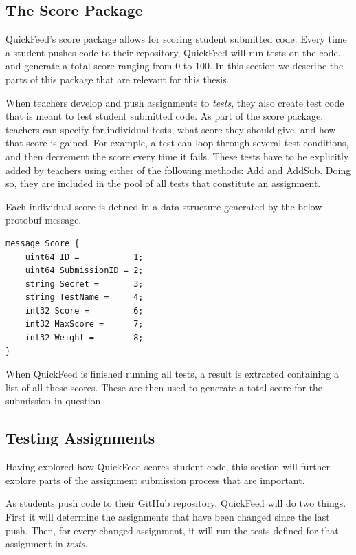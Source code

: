 \subsection{The Score Package}
\label{sec:the-score-package}

QuickFeed's score package allows for scoring student submitted code.
Every time a student pushes code to their repository, QuickFeed will run tests on the code, and generate a total score ranging from 0 to 100.
In this section we describe the parts of this package that are relevant for this thesis.

When teachers develop and push assignments to \textit{tests}, they also create test code that is meant to test student submitted code.
As part of the score package, teachers can specify for individual tests, what score they should give, and how that score is gained.
For example, a test can loop through several test conditions, and then decrement the score every time it fails.
These tests have to be explicitly added by teachers using either of the following methods: Add and AddSub.
Doing so, they are included in the pool of all tests that constitute an assignment.

Each individual score is defined in a data structure generated by the below protobuf message.

\begin{lstlisting}[caption={Score message}]
message Score {
    uint64 ID =           1;
    uint64 SubmissionID = 2;
    string Secret =       3;
    string TestName =     4;
    int32 Score =         6;
    int32 MaxScore =      7;
    int32 Weight =        8;
}
\end{lstlisting}

When QuickFeed is finished running all tests, a result is extracted containing a list of all these scores.
These are then used to generate a total score for the submission in question.

\subsection{Testing Assignments}

Having explored how QuickFeed scores student code, this section will further explore parts of the assignment submission process that are important.

As students push code to their GitHub repository, QuickFeed will do two things.
First it will determine the assignments that have been changed since the last push.
Then, for every changed assignment, it will run the tests defined for that assignment in \textit{tests}.

